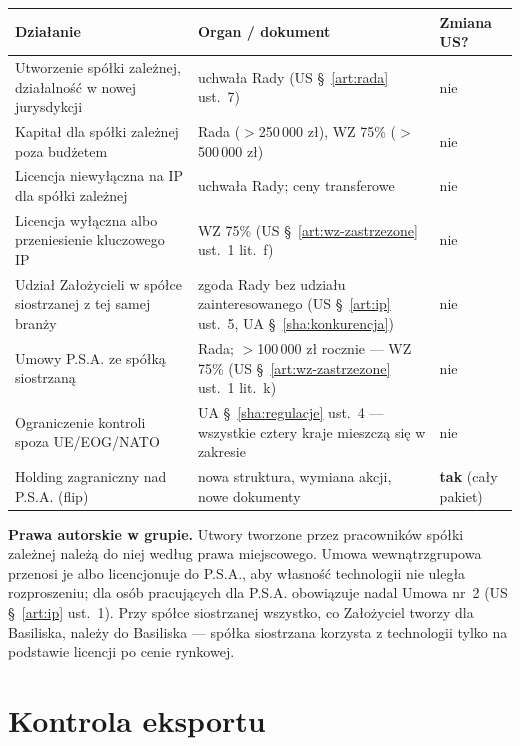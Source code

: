 \documentclass[11pt,a4paper]{report}
\newcommand{\US}[1]{US §~#1}
\newcommand{\UA}[1]{UA §~#1}
\begin{document}
\begin{center}
\small
\begin{tabularx}{\linewidth}{@{}>{\raggedright\arraybackslash}X >{\raggedright\arraybackslash}p{4.6cm} >{\raggedright\arraybackslash}p{2.6cm}@{}}
\toprule
\textbf{Działanie} & \textbf{Organ / dokument} & \textbf{Zmiana US?} \\
\midrule
Utworzenie spółki zależnej, działalność w nowej jurysdykcji & uchwała Rady (\US{\ref{art:rada} ust.~7}) & nie \\
Kapitał dla spółki zależnej poza budżetem & Rada ($>$250\,000 zł), WZ 75\% ($>$500\,000 zł) & nie \\
Licencja niewyłączna na IP dla spółki zależnej & uchwała Rady; ceny transferowe & nie \\
Licencja wyłączna albo przeniesienie kluczowego IP & WZ 75\% (\US{\ref{art:wz-zastrzezone} ust.~1 lit.~f}) & nie \\
Udział Założycieli w spółce siostrzanej z tej samej branży & zgoda Rady bez udziału zainteresowanego (\US{\ref{art:ip} ust.~5}, \UA{\ref{sha:konkurencja}}) & nie \\
Umowy P.S.A. ze spółką siostrzaną & Rada; $>$100\,000 zł rocznie --- WZ 75\% (\US{\ref{art:wz-zastrzezone} ust.~1 lit.~k}) & nie \\
Ograniczenie kontroli spoza UE/EOG/NATO & \UA{\ref{sha:regulacje} ust.~4} --- wszystkie cztery kraje mieszczą się w zakresie & nie \\
Holding zagraniczny nad P.S.A. (flip) & nowa struktura, wymiana akcji, nowe dokumenty & \textbf{tak} (cały pakiet) \\
\bottomrule
\end{tabularx}
\end{center}

\begin{Prawo}
\textbf{Prawa autorskie w grupie.} Utwory tworzone przez pracowników spółki zależnej należą do niej według prawa miejscowego. Umowa wewnątrzgrupowa przenosi je albo licencjonuje do P.S.A., aby własność technologii nie uległa rozproszeniu; dla osób pracujących dla P.S.A. obowiązuje nadal Umowa nr~2 (\US{\ref{art:ip} ust.~1}). Przy spółce siostrzanej wszystko, co Założyciel tworzy dla Basiliska, należy do Basiliska --- spółka siostrzana korzysta z technologii tylko na podstawie licencji po cenie rynkowej.
\end{Prawo}

\section{Kontrola eksportu}
\end{document}
